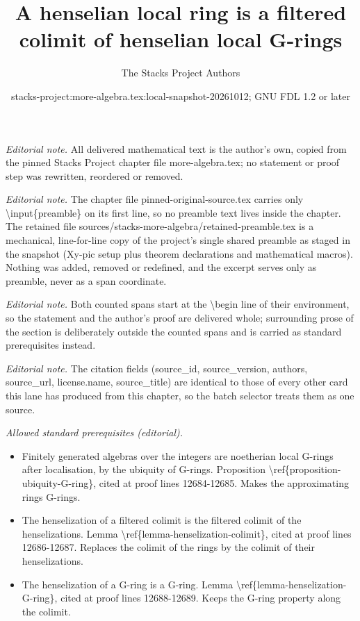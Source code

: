 \documentclass[10pt,a4paper]{amsart}
\title{A henselian local ring is a filtered colimit of henselian local G-rings}
\author{The Stacks Project Authors}
\date{stacks-project:more-algebra.tex:local-snapshot-20261012; GNU FDL 1.2 or later}
\theoremstyle{plain}
\theoremstyle{definition}
\theoremstyle{remark}
\numberwithin{equation}{subsection}
\begin{document}
\maketitle
\setcounter{subsection}{1}
\noindent\textit{Editorial note.} All delivered mathematical text is the author's own, copied from the pinned Stacks Project chapter file more-algebra.tex; no statement or proof step was rewritten, reordered or removed.\par\medskip
\noindent\textit{Editorial note.} The chapter file pinned-original-source.tex carries only \textbackslash{}input\{preamble\} on its first line, so no preamble text lives inside the chapter. The retained file sources/stacks-more-algebra/retained-preamble.tex is a mechanical, line-for-line copy of the project's single shared preamble as staged in the snapshot (Xy-pic setup plus theorem declarations and mathematical macros). Nothing was added, removed or redefined, and the excerpt serves only as preamble, never as a span coordinate.\par\medskip
\noindent\textit{Editorial note.} Both counted spans start at the \textbackslash{}begin line of their environment, so the statement and the author's proof are delivered whole; surrounding prose of the section is deliberately outside the counted spans and is carried as standard prerequisites instead.\par\medskip
\noindent\textit{Editorial note.} The citation fields (source\_id, source\_version, authors, source\_url, license.name, source\_title) are identical to those of every other card this lane has produced from this chapter, so the batch selector treats them as one source.\par\medskip
\noindent\textit{Allowed standard prerequisites (editorial).}\begin{itemize}
\item Finitely generated algebras over the integers are noetherian local G-rings after localisation, by the ubiquity of G-rings. Proposition \textbackslash{}ref\{proposition-ubiquity-G-ring\}, cited at proof lines 12684-12685. Makes the approximating rings G-rings.
\item The henselization of a filtered colimit is the filtered colimit of the henselizations. Lemma \textbackslash{}ref\{lemma-henselization-colimit\}, cited at proof lines 12686-12687. Replaces the colimit of the rings by the colimit of their henselizations.
\item The henselization of a G-ring is a G-ring. Lemma \textbackslash{}ref\{lemma-henselization-G-ring\}, cited at proof lines 12688-12689. Keeps the G-ring property along the colimit.
\end{itemize}\medskip
\end{document}
